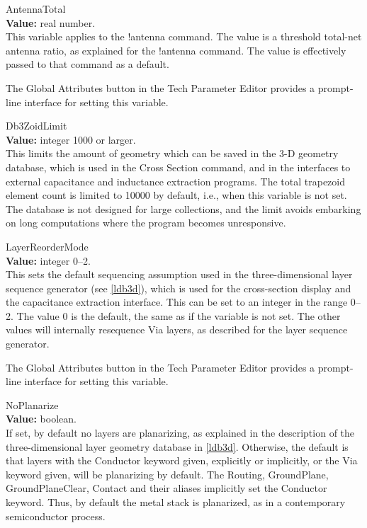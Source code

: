 \begin{description}
\item{\et AntennaTotal}\\
{\bf Value:} real number.\\
This variable applies to the {\cb !antenna} command.  The value is a
threshold total-net antenna ratio, as explained for the {\cb !antenna}
command.  The value is effectively passed to that command as a
default.

The {\cb Global Attributes} button in the {\cb Tech Parameter Editor}
provides a prompt-line interface for setting this variable.

\item{\et Db3ZoidLimit}\\
{\bf Value:} integer 1000 or larger.\\
This limits the amount of geometry which can be saved in the 3-D
geometry database, which is used in the {\cb Cross Section} command,
and in the interfaces to external capacitance and inductance
extraction programs.  The total trapezoid element count is limited to
10000 by default, i.e., when this variable is not set.  The database
is not designed for large collections, and the limit avoids embarking
on long computations where the program becomes unresponsive.

\item{\et LayerReorderMode}\\
{\bf Value:} integer 0--2.\\
This sets the default sequencing assumption used in the
three-dimensional layer sequence generator (see \ref{ldb3d}), which is
used for the cross-section display and the capacitance extraction
interface.  This can be set to an integer in the range 0--2.  The
value 0 is the default, the same as if the variable is not set.  The
other values will internally resequence {\vt Via} layers, as described
for the layer sequence generator.

The {\cb Global Attributes} button in the {\cb Tech Parameter Editor}
provides a prompt-line interface for setting this variable.

\item{\et NoPlanarize}\\
{\bf Value:} boolean.\\
If set, by default no layers are planarizing, as explained in the
description of the three-dimensional layer geometry database in
\ref{ldb3d}.  Otherwise, the default is that layers with the {\vt
Conductor} keyword given, explicitly or implicitly, or the {\vt Via}
keyword given, will be planarizing by default.  The {\vt Routing},
{\vt GroundPlane}, {\vt GroundPlaneClear}, {\vt Contact} and their
aliases implicitly set the {\vt Conductor} keyword.  Thus, by default
the metal stack is planarized, as in a contemporary semiconductor
process.


\end{description}
